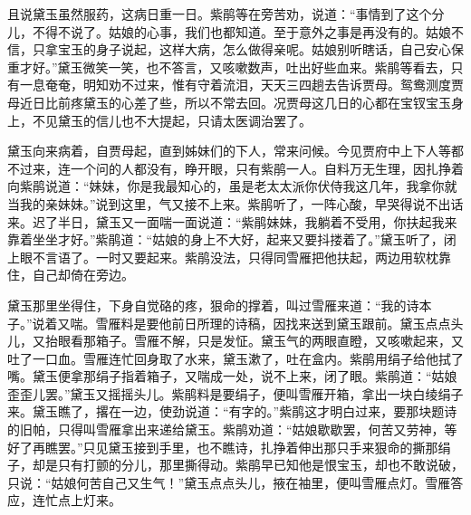 \begin{parag}
    且说黛玉虽然服药，这病日重一日。紫鹃等在旁苦劝，说道：“事情到了这个分儿，不得不说了。姑娘的心事，我们也都知道。至于意外之事是再没有的。姑娘不信，只拿宝玉的身子说起，这样大病，怎么做得亲呢。姑娘别听瞎话，自己安心保重才好。”黛玉微笑一笑，也不答言，又咳嗽数声，吐出好些血来。紫鹃等看去，只有一息奄奄，明知劝不过来，惟有守着流泪，天天三四趟去告诉贾母。鸳鸯测度贾母近日比前疼黛玉的心差了些，所以不常去回。况贾母这几日的心都在宝钗宝玉身上，不见黛玉的信儿也不大提起，只请太医调治罢了。
\end{parag}


\begin{parag}
    黛玉向来病着，自贾母起，直到姊妹们的下人，常来问候。今见贾府中上下人等都不过来，连一个问的人都没有，睁开眼，只有紫鹃一人。自料万无生理，因扎挣着向紫鹃说道：“妹妹，你是我最知心的，虽是老太太派你伏侍我这几年，我拿你就当我的亲妹妹。”说到这里，气又接不上来。紫鹃听了，一阵心酸，早哭得说不出话来。迟了半日，黛玉又一面喘一面说道：“紫鹃妹妹，我躺着不受用，你扶起我来靠着坐坐才好。”紫鹃道：“姑娘的身上不大好，起来又要抖搂着了。”黛玉听了，闭上眼不言语了。一时又要起来。紫鹃没法，只得同雪雁把他扶起，两边用软枕靠住，自己却倚在旁边。
\end{parag}


\begin{parag}
    黛玉那里坐得住，下身自觉硌的疼，狠命的撑着，叫过雪雁来道：“我的诗本子。”说着又喘。雪雁料是要他前日所理的诗稿，因找来送到黛玉跟前。黛玉点点头儿，又抬眼看那箱子。雪雁不解，只是发怔。黛玉气的两眼直瞪，又咳嗽起来，又吐了一口血。雪雁连忙回身取了水来，黛玉漱了，吐在盒内。紫鹃用绢子给他拭了嘴。黛玉便拿那绢子指着箱子，又喘成一处，说不上来，闭了眼。紫鹃道：“姑娘歪歪儿罢。”黛玉又摇摇头儿。紫鹃料是要绢子，便叫雪雁开箱，拿出一块白绫绢子来。黛玉瞧了，撂在一边，使劲说道：“有字的。”紫鹃这才明白过来，要那块题诗的旧帕，只得叫雪雁拿出来递给黛玉。紫鹃劝道：“姑娘歇歇罢，何苦又劳神，等好了再瞧罢。”只见黛玉接到手里，也不瞧诗，扎挣着伸出那只手来狠命的撕那绢子，却是只有打颤的分儿，那里撕得动。紫鹃早已知他是恨宝玉，却也不敢说破，只说：“姑娘何苦自己又生气！”黛玉点点头儿，掖在袖里，便叫雪雁点灯。雪雁答应，连忙点上灯来。
\end{parag}


